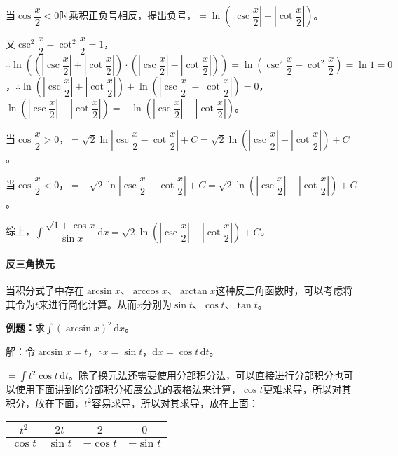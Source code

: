\documentclass[UTF8, 12pt]{ctexart}
\begin{document}
当$\cos\dfrac{x}{2}<0$时乘积正负号相反，提出负号，$=\ln\left(\left\vert\csc\dfrac{x}{2}\right\vert+\left\vert\cot\dfrac{x}{2}\right\vert\right)$。

又$\csc^2\dfrac{x}{2}-\cot^2\dfrac{x}{2}=1$，$\therefore\ln\left(\left(\left\vert\csc\dfrac{x}{2}\right\vert+\left\vert\cot\dfrac{x}{2}\right\vert\right)\cdot\left(\left\vert\csc\dfrac{x}{2}\right\vert-\left\vert\cot\dfrac{x}{2}\right\vert\right)\right)=\ln\left(\csc^2\dfrac{x}{2}-\cot^2\dfrac{x}{2}\right)=\ln1=0$，$\therefore\ln\left(\left\vert\csc\dfrac{x}{2}\right\vert+\left\vert\cot\dfrac{x}{2}\right\vert\right)+\ln\left(\left\vert\csc\dfrac{x}{2}\right\vert-\left\vert\cot\dfrac{x}{2}\right\vert\right)=0$，$\ln\left(\left\vert\csc\dfrac{x}{2}\right\vert+\left\vert\cot\dfrac{x}{2}\right\vert\right)=-\ln\left(\left\vert\csc\dfrac{x}{2}\right\vert-\left\vert\cot\dfrac{x}{2}\right\vert\right)$。

当$\cos\dfrac{x}{2}>0$，$=\sqrt{2}\ln\left\vert\csc\dfrac{x}{2}-\cot\dfrac{x}{2}\right\vert+C=\sqrt{2}\ln\left(\left\vert\csc\dfrac{x}{2}\right\vert-\left\vert\cot\dfrac{x}{2}\right\vert\right)+C$。

当$\cos\dfrac{x}{2}<0$，$=-\sqrt{2}\ln\left\vert\csc\dfrac{x}{2}-\cot\dfrac{x}{2}\right\vert+C=\sqrt{2}\ln\left(\left\vert\csc\dfrac{x}{2}\right\vert-\left\vert\cot\dfrac{x}{2}\right\vert\right)+C$。

综上，$\displaystyle{\int\dfrac{\sqrt{1+\cos x}}{\sin x}\textrm{d}x}=\sqrt{2}\ln\left(\left\vert\csc\dfrac{x}{2}\right\vert-\left\vert\cot\dfrac{x}{2}\right\vert\right)+C$。

\paragraph{反三角换元} \leavevmode \medskip

当积分式子中存在$\arcsin x$、$\arccos x$、$\arctan x$这种反三角函数时，可以考虑将其令为$t$来进行简化计算。从而$x$分别为$\sin t$、$\cos t$、$\tan t$。

\textbf{例题：}求$\int(\arcsin x)^2\,\textrm{d}x$。

解：令$\arcsin x=t$，$\therefore x=\sin t$，$\textrm{d}x=\cos t\,\textrm{d}t$。

$=\int t^2\cos t\,\textrm{d}t$。除了换元法还需要使用分部积分法，可以直接进行分部积分也可以使用下面讲到的分部积分拓展公式的表格法来计算，$\cos t$更难求导，所以对其积分，放在下面，$t^2$容易求导，所以对其求导，放在上面：\medskip

\begin{tabular}{|c|c|c|c|}
    \hline
    $t^2$ & $2t$ & $2$ & $0$ \\ \hline
    $\cos t$ & $\sin t$ & $-\cos t$ & $-\sin t$ \\
    \hline
\end{tabular} \medskip
\end{document}
